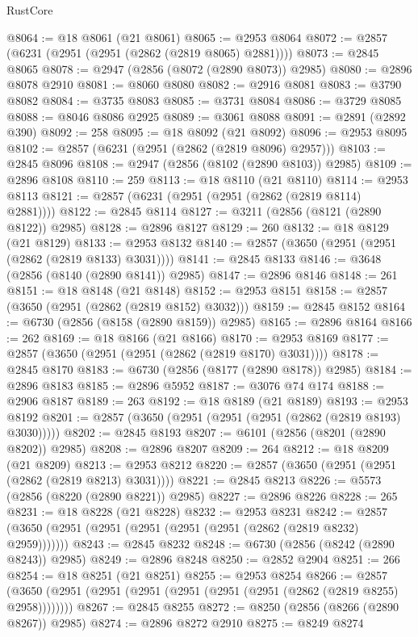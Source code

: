 \begin{lexlean}{RustCore}
\begin{coremodule}
@8064 := @18 @8061 (@21 @8061)
@8065 := @2953 @8064
@8072 := @2857 (@6231 (@2951 (@2951 (@2862 (@2819 @8065) @2881))))
@8073 := @2845 @8065
@8078 := @2947 (@2856 (@8072 (@2890 @8073)) @2985)
@8080 := @2896 @8078 @2910
@8081 := @8060 @8080
@8082 := @2916 @8081
@8083 := @3790 @8082
@8084 := @3735 @8083
@8085 := @3731 @8084
@8086 := @3729 @8085
@8088 := @8046 @8086 @2925
@8089 := @3061 @8088
@8091 := @2891 (@2892 @390)
@8092 := 258
@8095 := @18 @8092 (@21 @8092)
@8096 := @2953 @8095
@8102 := @2857 (@6231 (@2951 (@2862 (@2819 @8096) @2957)))
@8103 := @2845 @8096
@8108 := @2947 (@2856 (@8102 (@2890 @8103)) @2985)
@8109 := @2896 @8108
@8110 := 259
@8113 := @18 @8110 (@21 @8110)
@8114 := @2953 @8113
@8121 := @2857 (@6231 (@2951 (@2951 (@2862 (@2819 @8114) @2881))))
@8122 := @2845 @8114
@8127 := @3211 (@2856 (@8121 (@2890 @8122)) @2985)
@8128 := @2896 @8127
@8129 := 260
@8132 := @18 @8129 (@21 @8129)
@8133 := @2953 @8132
@8140 := @2857 (@3650 (@2951 (@2951 (@2862 (@2819 @8133) @3031))))
@8141 := @2845 @8133
@8146 := @3648 (@2856 (@8140 (@2890 @8141)) @2985)
@8147 := @2896 @8146
@8148 := 261
@8151 := @18 @8148 (@21 @8148)
@8152 := @2953 @8151
@8158 := @2857 (@3650 (@2951 (@2862 (@2819 @8152) @3032)))
@8159 := @2845 @8152
@8164 := @6730 (@2856 (@8158 (@2890 @8159)) @2985)
@8165 := @2896 @8164
@8166 := 262
@8169 := @18 @8166 (@21 @8166)
@8170 := @2953 @8169
@8177 := @2857 (@3650 (@2951 (@2951 (@2862 (@2819 @8170) @3031))))
@8178 := @2845 @8170
@8183 := @6730 (@2856 (@8177 (@2890 @8178)) @2985)
@8184 := @2896 @8183
@8185 := @2896 @5952
@8187 := @3076 @74 @174
@8188 := @2906 @8187
@8189 := 263
@8192 := @18 @8189 (@21 @8189)
@8193 := @2953 @8192
@8201 := @2857 (@3650 (@2951 (@2951 (@2951 (@2862 (@2819 @8193) @3030)))))
@8202 := @2845 @8193
@8207 := @6101 (@2856 (@8201 (@2890 @8202)) @2985)
@8208 := @2896 @8207
@8209 := 264
@8212 := @18 @8209 (@21 @8209)
@8213 := @2953 @8212
@8220 := @2857 (@3650 (@2951 (@2951 (@2862 (@2819 @8213) @3031))))
@8221 := @2845 @8213
@8226 := @5573 (@2856 (@8220 (@2890 @8221)) @2985)
@8227 := @2896 @8226
@8228 := 265
@8231 := @18 @8228 (@21 @8228)
@8232 := @2953 @8231
@8242 := @2857 (@3650 (@2951 (@2951 (@2951 (@2951 (@2951 (@2862 (@2819 @8232) @2959)))))))
@8243 := @2845 @8232
@8248 := @6730 (@2856 (@8242 (@2890 @8243)) @2985)
@8249 := @2896 @8248
@8250 := @2852 @2904
@8251 := 266
@8254 := @18 @8251 (@21 @8251)
@8255 := @2953 @8254
@8266 := @2857 (@3650 (@2951 (@2951 (@2951 (@2951 (@2951 (@2951 (@2862 (@2819 @8255) @2958))))))))
@8267 := @2845 @8255
@8272 := @8250 (@2856 (@8266 (@2890 @8267)) @2985)
@8274 := @2896 @8272 @2910
@8275 := @8249 @8274

\end{coremodule}
\end{lexlean}

